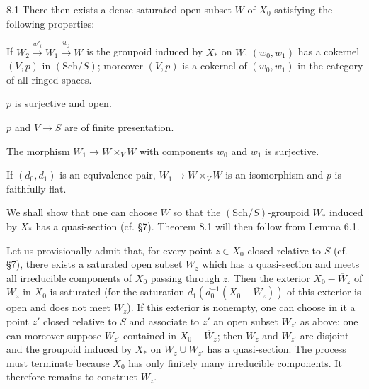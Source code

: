 \begin{theorem}{8.1}
There then exists a dense saturated open subset $W$ of $X_0$ satisfying the following properties:
\begin{enumeratei}
\item If $W_2\xrightarrow{w'_i}W_1\xrightarrow{w_j}W$ is the groupoid induced by $X_*$ on $W$, $(w_0,w_1)$ has a cokernel $(V,p)$ in $(\mathrm{Sch}/S)$; moreover $(V,p)$ is a cokernel of $(w_0,w_1)$ in the category of all ringed spaces.
\item $p$ is surjective and open.
\item[(ii')] $p$ and $V\to S$ are of finite presentation.
\item The morphism $W_1\to W\times_VW$ with components $w_0$ and $w_1$ is surjective.
\item If $(d_0,d_1)$ is an equivalence pair, $W_1\to W\times_VW$ is an isomorphism and $p$ is faithfully flat.
\end{enumeratei}
\end{theorem}
We shall show that one can choose $W$ so that the $(\mathrm{Sch}/S)$-groupoid $W_*$ induced by $X_*$ has a quasi-section (cf. §7). Theorem 8.1 will then follow from Lemma 6.1.

Let us provisionally admit that, for every point $z\in X_0$ closed relative to $S$ (cf. §7), there exists a saturated open subset $W_z$ which has a quasi-section and meets all irreducible components of $X_0$ passing through $z$. Then the exterior $X_0-\overline W_z$ of $W_z$ in $X_0$ is saturated (for the saturation $d_1(d_0^{-1}(X_0-\overline W_z))$ of this exterior is open and does not meet $W_z$). If this exterior is nonempty, one can choose in it a point $z'$ closed relative to $S$ and associate to $z'$ an open subset $W_{z'}$ as above; one can moreover suppose $W_{z'}$ contained in $X_0-\overline W_z$; then $W_z$ and $W_{z'}$ are disjoint and the groupoid induced by $X_*$ on $W_z\cup W_{z'}$ has a quasi-section. The process must terminate because $X_0$ has only finitely many irreducible components. It therefore remains to construct $W_z$.

